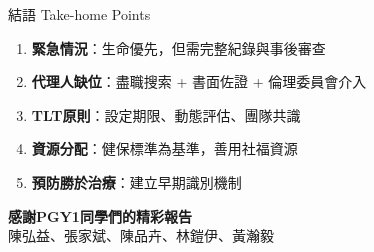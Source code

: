 \documentclass[aspectratio=169,12pt]{beamer}
\begin{document}
\begin{frame}{結語 Take-home Points}

\begin{enumerate}
    \item \textbf{緊急情況}：生命優先，但需\alert{完整紀錄}與\alert{事後審查}

    \vspace{0.3cm}

    \item \textbf{代理人缺位}：盡職搜索 + 書面佐證 + 倫理委員會介入

    \vspace{0.3cm}

    \item \textbf{TLT原則}：設定期限、動態評估、團隊共識

    \vspace{0.3cm}

    \item \textbf{資源分配}：健保標準為基準，善用社福資源

    \vspace{0.3cm}

    \item \textbf{預防勝於治療}：建立早期識別機制
\end{enumerate}

\vspace{0.5cm}
\centering
\begin{block}{}
\centering
\textbf{感謝PGY1同學們的精彩報告}\\
\small{陳弘益、張家斌、陳品卉、林鎧伊、黃瀚毅}
\end{block}

\end{frame}
\end{document}
